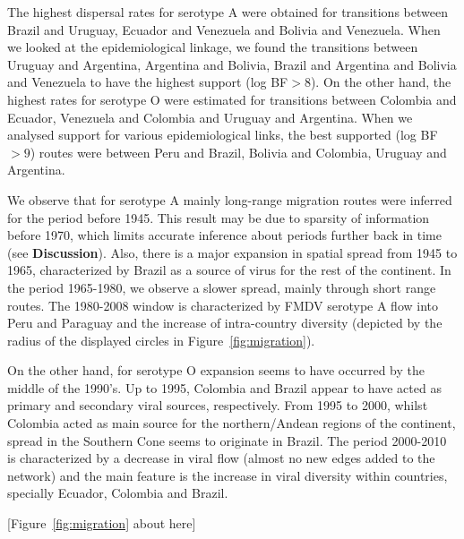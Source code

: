 \documentclass[10pt]{article}
\begin{document}
The highest dispersal rates for serotype A were obtained for transitions between Brazil and Uruguay, Ecuador and Venezuela and Bolivia and Venezuela.
When we looked at the epidemiological linkage, we found the transitions between Uruguay and Argentina, Argentina and Bolivia, Brazil and Argentina and Bolivia and Venezuela to have the highest support (log BF$>8$).
On the other hand, the highest rates for serotype O were estimated for transitions between Colombia and Ecuador, Venezuela and Colombia and Uruguay and Argentina.
When we analysed support for various epidemiological links, the best supported (log BF$>9$) routes were between Peru and Brazil, Bolivia and Colombia, Uruguay and Argentina.

We observe that for serotype A mainly long-range migration routes were inferred for the period before 1945.
This result may be due to sparsity of information before 1970, which limits accurate inference about periods further back in time (see {\bf Discussion}). 
Also, there is a major expansion in spatial spread from 1945 to 1965, characterized by Brazil as a source of virus for the rest of the continent.
In the period 1965-1980, we observe a slower spread, mainly through short range routes.
The 1980-2008 window is characterized by FMDV serotype A flow into Peru and Paraguay and the increase of intra-country diversity (depicted by the radius of the displayed circles in Figure~\ref{fig:migration}).   

On the other hand, for serotype O expansion seems to have occurred by the middle of the 1990's.
Up to 1995, Colombia and Brazil appear to have acted as primary and secondary viral sources, respectively.
From 1995 to 2000, whilst Colombia acted as main source for the northern/Andean regions of the continent, spread in the Southern Cone seems to originate in Brazil.
The period 2000-2010 is characterized by a decrease in viral flow (almost no new edges added to the network) and the main feature is the increase in viral diversity within countries, specially Ecuador, Colombia and Brazil.

\begin{center}
 [Figure~\ref{fig:migration} about here]
\end{center}
\end{document}
